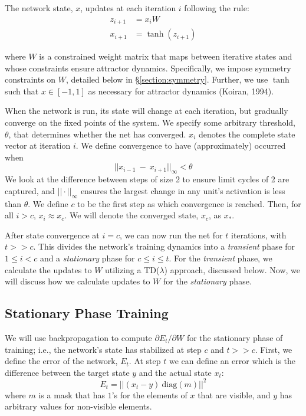 \documentclass[11pt,letterpaper]{article}
\newcommand{\diag}{{\ensuremath{\mathrm{diag}}}}
\theoremstyle{definition}
\begin{document}
The network state, $x$, updates at each iteration $i$ following the rule:
\begin{align*}
z_{i+1} &= x_i W \\
x_{i+1} &= \tanh(z_{i+1})
\end{align*}

where $W$ is a constrained weight matrix that maps between iterative states and whose constraints ensure attractor dynamics. Specifically, we impose symmetry constraints on $W$, detailed below in \S \ref{section:symmetry}. Further, we use $\tanh$ such that $x \in [-1, 1]$ as necessary for attractor dynamics (Koiran, 1994).

When the network is run, its state will change at each iteration, but gradually converge on the fixed points of the system. We specify some arbitrary threshold, $\theta$, that determines whether the net has converged. $x_i$ denotes the complete state vector at iteration $i$. We define convergence to have (approximately) occurred 
when 
\[
||x_{i-1}~-~x_{i+1}||_\infty<\theta
\] 
We look at the difference between steps of size 2 to ensure limit cycles of 2 are captured, and $|| \cdot ||_\infty$ ensures the largest change in any unit's activation is less than $\theta$. We define $c$ to be the first step as which convergence is reached. Then, for all $i > c$, $x_i \approx x_c$. We will denote the converged state, $x_c$, as $x_*$.

After state convergence at $i = c$, we can now run the net for $t$ iterations, with $t >> c$.  This divides the
network's training dynamics into a \emph{transient} phase for $1\le i<c$ and a \emph{stationary}
phase for $c \le i \le t$. For the \emph{transient} phase, we calculate the updates to $W$ utilizing a TD($\lambda$) approach, discussed below. Now, we will discuss how we calculate updates to $W$ for the \emph{stationary} phase.

\subsection{Stationary Phase Training}
We will use backpropagation to compute $\partial E_t / \partial W$ for the stationary phase of training; i.e., the network's state has stabilized at step $c$ and $t >> c$. First, we define the error of the network, $E_t$. At step $t$ we can define an error which is the difference
between the target state $y$ and the actual state $x_t$:
\begin{equation}
E_t = || (x_t - y)~\diag(m)||^2
\label{eq:Et}
\end{equation}
where $m$ is a mask that has $1$’s for the elements of $x$ that are visible, and $y$ has arbitrary values for non-visible elements.
\end{document}
